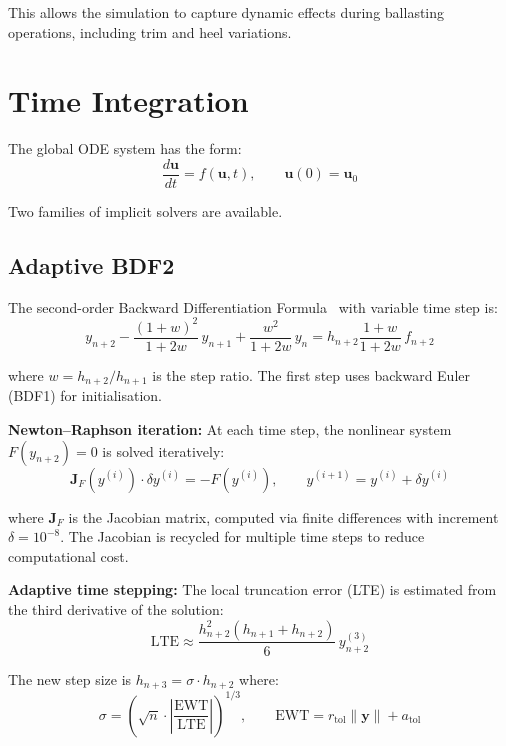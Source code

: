 \documentclass[11pt]{article}
\begin{document}
This allows the simulation to capture dynamic effects during ballasting operations, including trim and heel variations.


\section{Time Integration}
\label{sec:timeintegration}

The global ODE system has the form:
\begin{equation}
\frac{d\mathbf{u}}{dt} = f(\mathbf{u}, t), \qquad \mathbf{u}(0) = \mathbf{u}_0
\end{equation}

Two families of implicit solvers are available.

\subsection{Adaptive BDF2}

The second-order Backward Differentiation Formula~\cite{Celaya-2014} with variable time step is:
\begin{equation}
y_{n+2} - \frac{(1+w)^2}{1+2w}\,y_{n+1} + \frac{w^2}{1+2w}\,y_n = h_{n+2}\frac{1+w}{1+2w}\,f_{n+2}
\end{equation}

where $w = h_{n+2}/h_{n+1}$ is the step ratio. The first step uses backward Euler (BDF1) for initialisation.

\textbf{Newton--Raphson iteration:} At each time step, the nonlinear system $F(y_{n+2})=0$ is solved iteratively:
\begin{equation}
\mathbf{J}_F(y^{(i)})\cdot\delta y^{(i)} = -F(y^{(i)}), \qquad y^{(i+1)} = y^{(i)} + \delta y^{(i)}
\end{equation}

where $\mathbf{J}_F$ is the Jacobian matrix, computed via finite differences with increment $\delta = 10^{-8}$. The Jacobian is recycled for multiple time steps to reduce computational cost.

\textbf{Adaptive time stepping:} The local truncation error (LTE) is estimated from the third derivative of the solution:
\begin{equation}
\text{LTE} \approx \frac{h_{n+2}^2(h_{n+1}+h_{n+2})}{6}\,y^{(3)}_{n+2}
\end{equation}

The new step size is $h_{n+3} = \sigma\cdot h_{n+2}$ where:
\begin{equation}
\sigma = \left(\sqrt{n}\cdot\left|\frac{\text{EWT}}{\text{LTE}}\right|\right)^{1/3}, \qquad \text{EWT} = r_{\text{tol}}\|\mathbf{y}\| + a_{\text{tol}}
\end{equation}
\end{document}
